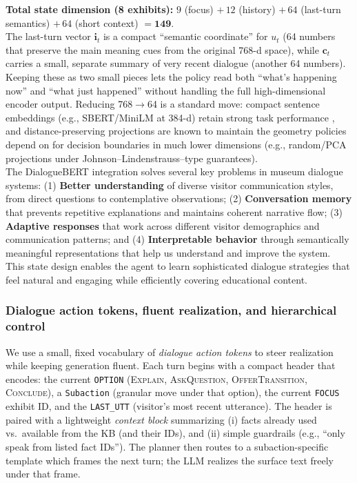 \documentclass[12pt]{article}
\begin{document}
\noindent\textbf{Total state dimension (8 exhibits):} $9$ (focus) $+\,12$ (history) $+\,64$ (last-turn semantics) $+\,64$ (short context) $= \mathbf{149}$.\\

The last-turn vector $\mathbf{i}_t$ is a compact “semantic coordinate” for $u_t$ (64 numbers that preserve the main meaning cues from the original 768-d space), while $\mathbf{c}_t$ carries a small, separate summary of very recent dialogue (another 64 numbers). Keeping these as two small pieces lets the policy read both “what’s happening now” and “what just happened” without handling the full high-dimensional encoder output. Reducing 768$\rightarrow$64 is a standard move: compact sentence embeddings (e.g., SBERT/MiniLM at 384-d) retain strong task performance \citep{reimers2019sbert,wang2020minilm}, and distance-preserving projections are known to maintain the geometry policies depend on for decision boundaries in much lower dimensions (e.g., random/PCA projections under Johnson–Lindenstrauss–type guarantees).\\

The DialogueBERT integration solves several key problems in museum dialogue systems: (1) \textbf{Better understanding} of diverse visitor communication styles, from direct questions to contemplative observations; (2) \textbf{Conversation memory} that prevents repetitive explanations and maintains coherent narrative flow; (3) \textbf{Adaptive responses} that work across different visitor demographics and communication patterns; and (4) \textbf{Interpretable behavior} through semantically meaningful representations that help us understand and improve the system.\\

This state design enables the agent to learn sophisticated dialogue strategies that feel natural and engaging while efficiently covering educational content.

\subsubsection{Dialogue action tokens, fluent realization, and hierarchical control}
\label{sec:dat-templates}

We use a small, fixed vocabulary of \emph{dialogue action tokens} to steer realization while keeping generation fluent. Each turn begins with a compact header that encodes: the current \texttt{OPTION} (\textsc{Explain}, \textsc{AskQuestion}, \textsc{OfferTransition}, \textsc{Conclude}), a \texttt{Subaction} (granular move under that option), the current \texttt{FOCUS} exhibit ID, and the \texttt{LAST\_UTT} (visitor’s most recent utterance). The header is paired with a lightweight \emph{context block} summarizing (i) facts already used vs.\ available from the KB (and their IDs), and (ii) simple guardrails (e.g., “only speak from listed fact IDs”). The planner then routes to a subaction-specific template which frames the next turn; the LLM realizes the surface text freely under that frame.\\
\end{document}
